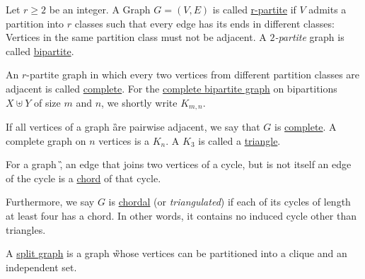 \begin{graphclass}[r-partite]
    Let $r \geq 2$ be an integer. A Graph $G = (V, E)$ is called \underline{r-partite} if $V$ admits a partition into $r$ classes such that every edge has its ends in different classes: Vertices in the same partition class must not be adjacent. 
    A \textit{$2$-partite} graph is called \underline{bipartite}. 
    
    An $r$-partite graph in which every two vertices from different partition classes are adjacent is called \underline{complete}. For the \underline{complete bipartite graph} on bipartitions $X \uplus Y$ of size $m$ and $n$, we shortly write $K_{m,n}$. 
\end{graphclass}

\begin{graphclass}[Complete]
If all vertices of a graph \G are pairwise adjacent, we say that $G$ is \underline{complete}. 
A complete graph on $n$ vertices is a $K_n$. A $K_3$ is called a \underline{triangle}.
\end{graphclass}



\begin{graphclass}[Chordal]
For a graph \G, an edge that joins two vertices of a cycle, but is not itself an edge of the cycle is a \underline{chord} of that cycle.

Furthermore, we say $G$ is \underline{chordal} (or \textit{triangulated}) if each of its cycles of length at least four has a chord. In other words, it contains no induced cycle other than triangles.

\end{graphclass}

\begin{graphclass}[Split]
A \underline{split graph} is a graph \G whose vertices can be partitioned into a clique and an independent set.    
\end{graphclass}


